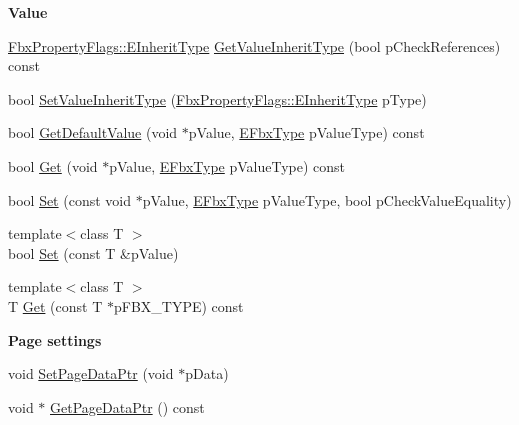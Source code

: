 \begin{Indent}\textbf{ Value}\par
\begin{DoxyCompactItemize}
\item 
\hyperlink{class_fbx_property_flags_ae3b667a4fcac4b827fa186a698fec2f8}{Fbx\+Property\+Flags\+::\+E\+Inherit\+Type} \hyperlink{class_fbx_property_handle_a899c4594086890878626f4755da6c690}{Get\+Value\+Inherit\+Type} (bool p\+Check\+References) const
\item 
bool \hyperlink{class_fbx_property_handle_a3f03d6a87ab11bffdd30923485272f4a}{Set\+Value\+Inherit\+Type} (\hyperlink{class_fbx_property_flags_ae3b667a4fcac4b827fa186a698fec2f8}{Fbx\+Property\+Flags\+::\+E\+Inherit\+Type} p\+Type)
\item 
bool \hyperlink{class_fbx_property_handle_a921ee7d24d875d04ae00037b7e9fb4dc}{Get\+Default\+Value} (void $\ast$p\+Value, \hyperlink{fbxpropertytypes_8h_a73913a5ddfb20e57c6f25e9e6784bd92}{E\+Fbx\+Type} p\+Value\+Type) const
\item 
bool \hyperlink{class_fbx_property_handle_a0fe268c3bc03617fda8f7ab33830f5c4}{Get} (void $\ast$p\+Value, \hyperlink{fbxpropertytypes_8h_a73913a5ddfb20e57c6f25e9e6784bd92}{E\+Fbx\+Type} p\+Value\+Type) const
\item 
bool \hyperlink{class_fbx_property_handle_a9beb20c6080c4f51fb01a547cc53807f}{Set} (const void $\ast$p\+Value, \hyperlink{fbxpropertytypes_8h_a73913a5ddfb20e57c6f25e9e6784bd92}{E\+Fbx\+Type} p\+Value\+Type, bool p\+Check\+Value\+Equality)
\item 
{\footnotesize template$<$class T $>$ }\\bool \hyperlink{class_fbx_property_handle_adb42ced01547310727f58275d2a9463c}{Set} (const T \&p\+Value)
\item 
{\footnotesize template$<$class T $>$ }\\T \hyperlink{class_fbx_property_handle_af67a0926e9905c19cc7b2a60b4d89adb}{Get} (const T $\ast$p\+F\+B\+X\+\_\+\+T\+Y\+PE) const
\end{DoxyCompactItemize}
\end{Indent}
\begin{Indent}\textbf{ Page settings}\par
\begin{DoxyCompactItemize}
\item 
void \hyperlink{class_fbx_property_handle_ac980bb1090ea5fd32c9587e3f0b9ac9b}{Set\+Page\+Data\+Ptr} (void $\ast$p\+Data)
\item 
void $\ast$ \hyperlink{class_fbx_property_handle_a477ba4c610b36333701547d8aff9fa48}{Get\+Page\+Data\+Ptr} () const
\end{DoxyCompactItemize}
\end{Indent}
